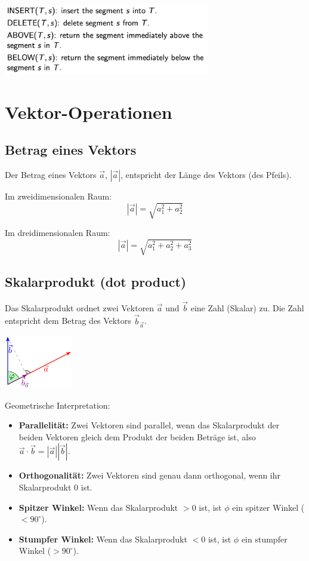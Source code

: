 \documentclass[10pt,a4paper,twocolumn]{article}
\begin{document}
\begin{center}
	\includegraphics[width=9cm]{images/operation-sweep-lines}
\end{center}



\section{Vektor-Operationen}

\subsection{Betrag eines Vektors}
Der Betrag eines Vektors $\vec{a}$, $|\vec{a}|$, entspricht der Länge des Vektors (des Pfeils).

\vspace{10pt}

Im zweidimensionalen Raum:
\[
|\vec{a}|=\sqrt{a_1^2+a_2^2}
\]

Im dreidimensionalen Raum:
\[
|\vec{a}|=\sqrt{a_1^2+a_2^2+a_3^2}
\]

\subsection{Skalarprodukt (dot product)}
Das Skalarprodukt ordnet zwei Vektoren $\vec{a}$ und $\vec{b}$ eine Zahl (Skalar) zu. Die Zahl entspricht dem Betrag des Vektors $\vec{b}_{\vec{a}}$.

\begin{center}
\includegraphics[width=3cm]{images/skalarprodukt.png}
\end{center}

\vspace{10pt}

Geometrische Interpretation:
\begin{itemize}
\item \textbf{Parallelität:} Zwei Vektoren sind parallel, wenn das Skalarprodukt der beiden Vektoren gleich dem Produkt der beiden Beträge ist, also $\vec{a}\cdot\vec{b}=|\vec{a}||\vec{b}|$.
\item \textbf{Orthogonalität:} Zwei Vektoren sind genau dann orthogonal, wenn ihr Skalarprodukt 0 ist.
\item \textbf{Spitzer Winkel:} Wenn das Skalarprodukt $>0$ ist, ist $\phi$ ein spitzer Winkel ($<90^\circ$).
\item \textbf{Stumpfer Winkel:} Wenn das Skalarprodukt $<0$ ist, ist $\phi$ ein stumpfer Winkel ($>90^\circ$).
\end{itemize}
\end{document}
